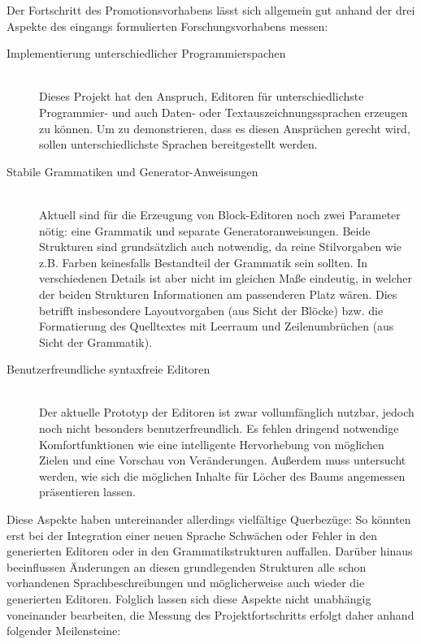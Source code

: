 \documentclass[paper=a4,fontsize=11pt,parskip=half]{scrartcl}
\begin{document}
Der Fortschritt des Promotionsvorhabens lässt sich allgemein gut anhand der drei Aspekte des eingangs formulierten Forschungsvorhabens messen:

\begin{description}
\item[Implementierung unterschiedlicher Programmierspachen] \hfill\\
  Dieses Projekt hat den Anspruch, Editoren für unterschiedlichste Programmier- und auch Daten- oder Textauszeichnungssprachen erzeugen zu können. Um zu demonstrieren, dass es diesen Ansprüchen gerecht wird, sollen unterschiedlichste Sprachen bereitgestellt werden.

\item[Stabile Grammatiken und Generator-Anweisungen] \hfill\\
  Aktuell sind für die Erzeugung von Block-Editoren noch zwei Parameter nötig: eine Grammatik und separate Generatoranweisungen. Beide Strukturen sind grundsätzlich auch notwendig, da reine Stilvorgaben wie z.B. Farben keinesfalls Bestandteil der Grammatik sein sollten. In verschiedenen Details ist aber nicht im gleichen Maße eindeutig, in welcher der beiden Strukturen Informationen am passenderen Platz wären. Dies betrifft insbesondere Layoutvorgaben (aus Sicht der Blöcke) bzw. die Formatierung des Quelltextes mit Leerraum und Zeilenumbrüchen (aus Sicht der Grammatik).

\item[Benutzerfreundliche syntaxfreie Editoren] \hfill\\
  Der aktuelle Prototyp der Editoren ist zwar vollumfänglich nutzbar, jedoch noch nicht besonders benutzerfreundlich. Es fehlen dringend notwendige Komfortfunktionen wie eine intelligente Hervorhebung von möglichen Zielen und eine Vorschau von Veränderungen. Außerdem muss untersucht werden, wie sich die möglichen Inhalte für Löcher des Baums angemessen präsentieren lassen.
\end{description}

Diese Aspekte haben untereinander allerdings vielfältige Querbezüge: So könnten erst bei der Integration einer neuen Sprache Schwächen oder Fehler in den generierten Editoren oder in den Grammatikstrukturen auffallen. Darüber hinaus beeinflussen Änderungen an diesen grundlegenden Strukturen alle schon vorhandenen Sprachbeschreibungen und möglicherweise auch wieder die generierten Editoren. Folglich lassen sich diese Aspekte nicht unabhängig voneinander bearbeiten, die Messung des Projektfortschritts erfolgt daher anhand folgender Meilensteine:
\end{document}
